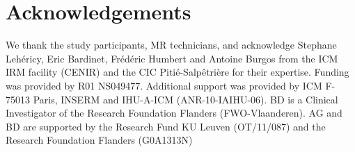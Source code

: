 \section{Acknowledgements}

We thank the study participants, MR technicians, and acknowledge Stephane Lehéricy, Eric Bardinet, Frédéric Humbert and
Antoine Burgos from the ICM IRM facility (CENIR) and the CIC
Pitié-Salpêtrière for their expertise. Funding was provided by R01 NS049477. Additional support was provided by ICM F-75013 Paris, INSERM and IHU-A-ICM
(ANR-10-IAIHU-06). BD is a Clinical Investigator of the Research Foundation Flanders (FWO-Vlaanderen). AG and BD are supported by the Research Fund KU Leuven (OT/11/087) and the Research Foundation Flanders (G0A1313N)